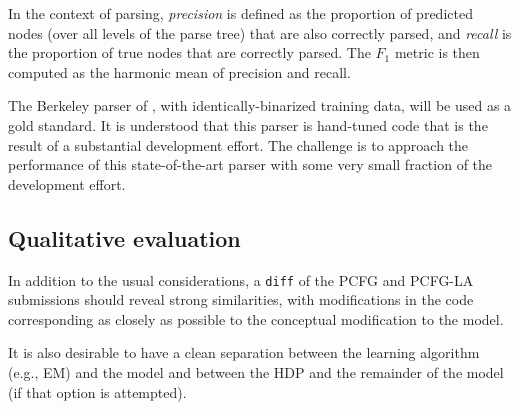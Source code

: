 \documentclass[english]{article}
\begin{document}
In the context of parsing, \emph{precision} is defined as the proportion of predicted nodes (over all levels of the parse tree) that are also correctly parsed, and \emph{recall} is the proportion of true nodes that are correctly parsed. The $F_{1}$ metric is then computed as the harmonic mean of precision and recall.

The Berkeley parser of \citet{Petrov}, with identically-binarized training data, will be used as a gold standard. It is understood that this parser is hand-tuned code that is the result of a substantial development effort. The challenge is to approach the performance of this state-of-the-art parser with some very small fraction of the development effort.

\subsection{Qualitative evaluation}

In addition to the usual considerations, a \texttt{diff} of the PCFG and PCFG-LA submissions should reveal strong similarities, with modifications in the code corresponding as closely as possible to the conceptual modification to the model.

It is also desirable to have a clean separation between the learning algorithm (e.g., EM) and the model and between the HDP and the remainder of the model (if that option is attempted).


 
\end{document}
